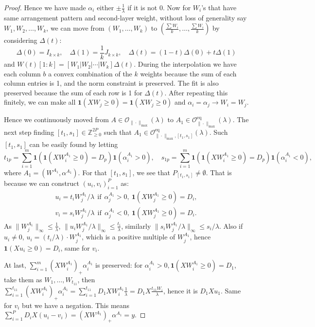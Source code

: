 \documentclass{article}
\newcommand{\eq}{\mathrm{eq}}      %
\begin{document}
\begin{proof}
Hence we have made $\alpha_i$ either $\pm \frac{1}{\lambda}$ if it is not 0.
Now for $W_i$'s that have same arrangement pattern and second-layer weight, without loss of generality say $W_1, W_2, \dots, W_k$, we can move from $(W_1, \dots, W_k)$ to $(\frac{\sum W_i}{k}, \dots, \frac{\sum W_i}{k})$ by considering $\Delta(t)$:
\[
\Delta(0) = I_{k \times k}, \quad \Delta(1) = \frac{1}{k} J_{k \times k}, \quad \Delta(t) = (1-t)\Delta(0) + t\Delta(1)
\] and $W(t)[1:k] = [W_1|W_2|\cdots|W_k]\Delta(t)$. During the interpolation we have each column $b$ a convex combination of the $k$ weights because the sum of each column entries is 1, and the norm constraint is preserved. The fit is also preserved because the sum of each row is 1 for $\Delta(t)$. After repeating this finitely, we can make all $\mathbf{1}(XW_j \geq 0) = \mathbf{1}(XW_j \geq 0)$ and $\alpha_i = \alpha_j \rightarrow W_i = W_j$.

Hence we continuously moved from $A \in \mathcal{O}_{\|\cdot\|_{\max}}(\lambda)$ to $A_1 \in \mathcal{O}_{\|\cdot\|_{\max}}^{\eq}(\lambda)$. The next step finding $[t_1, s_1] \in \mathbb{Z}_{\geq 0}^{2P}$ such that $A_1 \in \mathcal{O}_{\|\cdot\|_{\max}, [t_1, s_1]}^{\eq}(\lambda)$. Such $[t_1, s_1]$ can be easily found by letting
\[
t_{1p} = \sum_{i=1}^{m} \mathbf{1}(\mathbf{1}(XW^{A_1}_i \geq 0) = D_p)\mathbf{1}(\alpha^{A_1}_i > 0), \quad s_{1p} = \sum_{i=1}^{m} \mathbf{1}(\mathbf{1}(XW^{A_1}_i \geq 0) = D_p)\mathbf{1}(\alpha^{A_1}_i < 0),
\]
where $A_1 = (W^{A_1}, \alpha^{A_1})$.
For that $[t_1, s_1]$, we see that $P_{[t_1, s_1]} \neq \emptyset$. That is because we can construct $(u_i, v_i)_{i=1}^P$ as:
\begin{align*}
u_i = t_i W^{A_1}_j / \lambda \ \  \textrm{if}\ \  \alpha^{A_1}_j > 0,\ \mathbf{1}(XW^{A_1}_j \geq 0) = D_i,\\
v_i = s_i W^{A_1}_j / \lambda \ \  \textrm{if} \ \  \alpha^{A_1}_j < 0,\ \mathbf{1}(XW^{A_1}_j \geq 0) = D_i.
\end{align*}
As $\|W^{A_1}_j\|_\infty \leq \frac{1}{\lambda}$, $\|u_i W^{A_1}_j / \lambda\|_\infty \leq \frac{t_i}{\lambda}$, similarly $\|s_i W^{A_1}_j / \lambda\|_\infty \leq s_i / \lambda$. Also if $u_i \neq 0$, $u_i = (t_i/\lambda) \cdot W^{A_1}_j$, which is a positive multiple of $W^{A_1}_j$, hence $\mathbf{1}(Xu_i \geq 0) = D_i$, same for $v_i$.

At last, $\sum_{i=1}^m (XW^{A_1}_i)_{+} \alpha^{A_1}_i$ is preserved: for $\alpha^{A_1}_i > 0, \mathbf{1}(XW^{A_1}_i \geq 0) = D_1$, take them as $W_1, \dots, W_{t_{11}}$, then
$\sum_{i=1}^{t_{11}} (XW^{A_1}_i)_{+} \alpha_i^{A_1} = \sum_{i=1}^{t_{11}} D_1 X W_i^{A_1} \frac{1}{\lambda} = D_1 X \frac{t_{11} W_i}{\lambda}$, hence it is $D_1Xu_1$. Same for $v_i$ but we have a negation. This means $\sum_{i=1}^P D_i X (u_i - v_i) = (XW^{A_1})_{+}\alpha^{A_1} = y$.


\end{proof}
\end{document}

